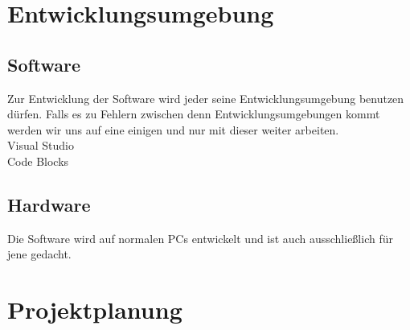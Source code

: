 \documentclass[a4paper,12pt]{scrreprt}
\begin{document}
	
\chapter{Entwicklungsumgebung}
	
	\section{Software}
		Zur Entwicklung der Software wird jeder seine Entwicklungsumgebung benutzen dürfen. Falls es zu Fehlern zwischen denn Entwicklungsumgebungen kommt werden wir uns auf eine einigen und nur mit dieser weiter arbeiten.\\		
		Visual Studio \\
		Code Blocks
		
		
		
	\section{Hardware}
		
		
		Die Software wird auf normalen PCs entwickelt und ist auch ausschließlich für jene gedacht.
		
		
		
\chapter{Projektplanung}



	
	
\end{document}
